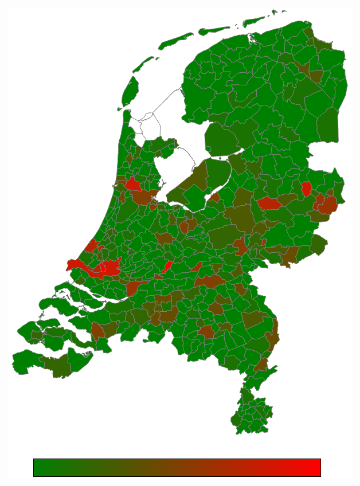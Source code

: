 \documentclass[a4paper,twoside,11pt]{article}
\begin{document}
\begin{figure}[h]
\begin{subfigure}[b]{0.118\textwidth}
                \includegraphics[width=\textwidth]{Heatmaps/HeatMap11.png}
                \caption{}
                \label{fig:Turkish}
        \end{subfigure}
        \begin{subfigure}[b]{0.118\textwidth}

\end{subfigure}
\end{figure}
\end{document}
